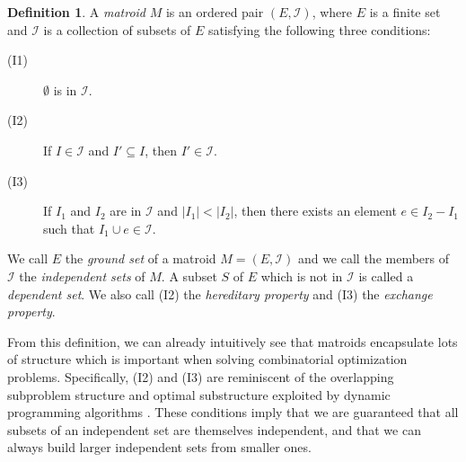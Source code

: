 \documentclass[a4paper,11pt]{report}
\theoremstyle{plain}
\theoremstyle{definition}
\newtheorem{defn}[defn]{Definition}
\newcommand{\I}{\mathcal{I}}
\begin{document}
\begin{defn}
A \emph{matroid} $M$ is an ordered pair $(E, \I)$, where $E$ is a finite
set and $\I$ is a collection of subsets of $E$ satisfying the
following three conditions:
\begin{description}
    \item[(I1)] $\emptyset$ is in $\I$.
    \item[(I2)] If $I \in \I$ and $I' \subseteq I$, then $I' \in
                \I$.
    \item[(I3)] If $I_1$ and $I_2$ are in $\I$ and $|I_1| < |I_2|$,
                then there exists an element $e \in I_2 - I_1$ such that
                $I_1 \cup e \in \I$.
\end{description}
\end{defn}

We call $E$ the \emph{ground set} of a matroid $M = (E, \I)$ and we call
the members of $\I$ the \emph{independent sets} of $M$. A subset $S$ of $E$
which is not in $\I$ is called a \emph{dependent set}. We also call (I2)
the \emph{hereditary property} and (I3) the \emph{exchange property}.

From this definition, we can already intuitively see that matroids encapsulate
lots of structure which is important when solving combinatorial optimization
problems. Specifically, (I2) and (I3) are reminiscent of the overlapping
subproblem structure and optimal substructure exploited by dynamic programming
algorithms \cite{clrs}. These conditions imply that we are guaranteed that all
subsets of an independent set are themselves independent, and that we can
always build larger independent sets from smaller ones\footnotemark.

\end{document}
